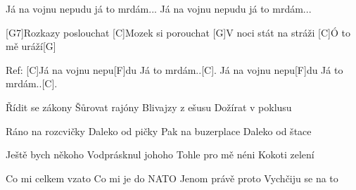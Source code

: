
Já na vojnu nepudu
já to mrdám...
Já na vojnu nepudu
já to mrdám...

[G7]Rozkazy poslouchat
[C]Mozek si porouchat
[G]V noci stát na stráži
[C]\null Ó to mě uráží[G]

Ref:
[C]Já na vojnu nepu[F]du
Já to mrdám..[C].
Já na vojnu nepu[F]du
Já to mrdám..[C].

\begin{multicols}{2}
	
	Řídit se zákony
	Šůrovat rajóny
	Blivajzy z ešusu
	Dožírat v poklusu
	
	Ráno na rozcvičky
	Daleko od pičky
	Pak na buzerplace
	Daleko od štace
	\slpc
	
	Ještě bych někoho
	Vodprásknul johoho
	Tohle pro mě néni
	Kokoti zelení
	
	Co mi celkem vzato 
	Co mi je do NATO
	Jenom právě proto
	Vychčiju se na to \vfill
	
\end{multicols}